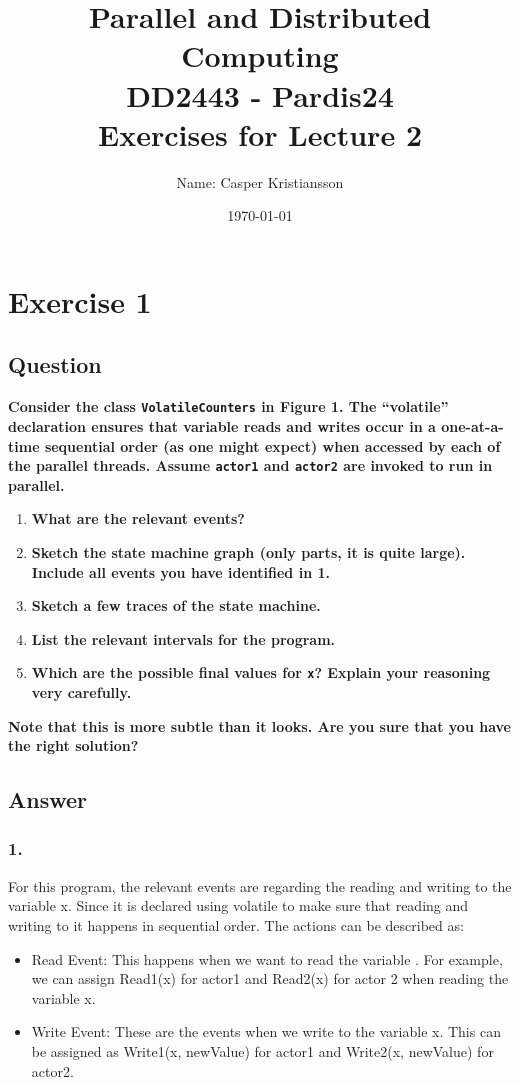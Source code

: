 \documentclass{article}
\title{\textbf{Parallel and Distributed Computing\\DD2443 - Pardis24\\Exercises for Lecture 2}}
\author{Name: Casper Kristiansson}
\date{\today}
\begin{document}
\setlength\parindent{0pt}
\setlength{\parskip}{\bigskipamount}

\maketitle

\section*{Exercise 1}
\subsection*{Question}
\textbf{Consider the class \texttt{VolatileCounters} in Figure 1. The ``volatile'' declaration ensures that variable reads and writes occur in a one-at-a-time sequential order (as one might expect) when accessed by each of the parallel threads. Assume \texttt{actor1} and \texttt{actor2} are invoked to run in parallel.}

\begin{enumerate}
    \item \textbf{What are the relevant events?}
    \item \textbf{Sketch the state machine graph (only parts, it is quite large). Include all events you have identified in 1.}
    \item \textbf{Sketch a few traces of the state machine.}
    \item \textbf{List the relevant intervals for the program.}
    \item \textbf{Which are the possible final values for \texttt{x}? Explain your reasoning very carefully.}
\end{enumerate}

\textbf{Note that this is more subtle than it looks. Are you sure that you have the right solution?}

\subsection*{Answer}
\subsubsection*{1.}
For this program, the relevant events are regarding the reading and writing to the variable x. Since it is declared using volatile to make sure that reading and writing to it happens in sequential order. The actions can be described as:

\begin{itemize}
    \item Read Event: This happens when we want to read the variable \cite{Volatile76:online}. For example, we can assign Read1(x) for actor1 and Read2(x) for actor 2 when reading the variable x.
    \item Write Event: These are the events when we write to the variable x. This can be assigned as Write1(x, newValue) for actor1 and Write2(x, newValue) for actor2.
\end{itemize}
\end{document}
